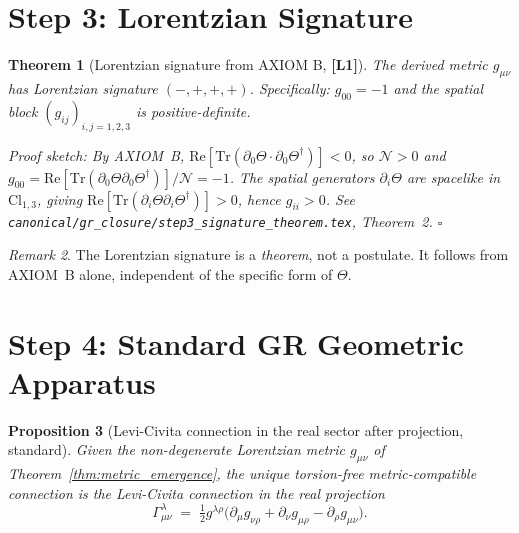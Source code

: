 \documentclass[12pt,a4paper]{article}
\newtheorem{theorem}{Theorem}[section]
\newtheorem{proposition}[theorem]{Proposition}
\theoremstyle{definition}
\theoremstyle{remark}
\newtheorem{remark}[theorem]{Remark}
\newcommand{\Lone}{\textbf{[L1]}}
\newcommand{\calN}{\mathcal{N}}            %
\begin{document}
\section{Step 3: Lorentzian Signature}
\label{sec:step3}

\begin{theorem}[Lorentzian signature from AXIOM B, \Lone]
\label{thm:signature}
The derived metric $g_{\mu\nu}$ has Lorentzian signature $(-,+,+,+)$.
Specifically: $g_{00} = -1$ and the spatial block $(g_{ij})_{i,j=1,2,3}$
is positive-definite.

\medskip
\emph{Proof sketch}: By AXIOM~B,
$\mathrm{Re}[\mathrm{Tr}(\partial_0\Theta\cdot\partial_0\Theta^\dagger)] < 0$,
so $\calN > 0$ and $g_{00} = \mathrm{Re}[\mathrm{Tr}(\partial_0\Theta
\partial_0\Theta^\dagger)]/\calN = -1$.
The spatial generators $\partial_i\Theta$ are spacelike in $\mathrm{Cl}_{1,3}$,
giving $\mathrm{Re}[\mathrm{Tr}(\partial_i\Theta\partial_i\Theta^\dagger)] > 0$,
hence $g_{ii} > 0$.
See \texttt{canonical/gr\_closure/step3\_signature\_theorem.tex}, Theorem~2.
\hfill$\square$
\end{theorem}

\begin{remark}
The Lorentzian signature is a \emph{theorem}, not a postulate.  It follows from
AXIOM~B alone, independent of the specific form of $\Theta$.
\end{remark}

\section{Step 4: Standard GR Geometric Apparatus}
\label{sec:step4}

\begin{proposition}[Levi-Civita connection in the real sector after projection, standard]
\label{prop:levi_civita}
Given the non-degenerate Lorentzian metric $g_{\mu\nu}$ of
Theorem~\ref{thm:metric_emergence}, the unique torsion-free metric-compatible
connection is the Levi-Civita connection in the real projection
\[
  \Gamma^\lambda_{\mu\nu} \;=\; \tfrac{1}{2}g^{\lambda\rho}
  \bigl(\partial_\mu g_{\nu\rho} + \partial_\nu g_{\mu\rho} - \partial_\rho g_{\mu\nu}\bigr).
\]
\end{proposition}
\end{document}
